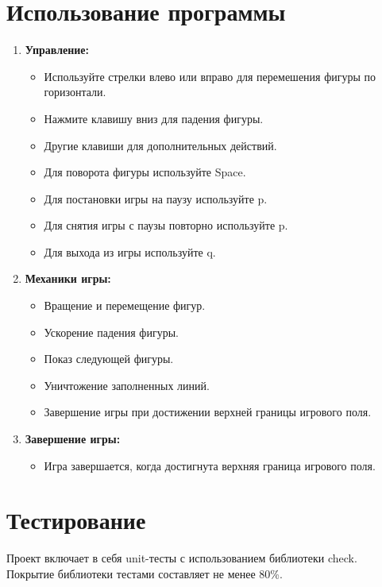 \documentclass[11pt,a4paper]{article}
\begin{document}
\section{Использование программы}

\begin{enumerate}
    \item \textbf{Управление:}
        \begin{itemize}
            \item Используйте стрелки влево или вправо для перемешения фигуры по горизонтали.
            \item Нажмите клавишу вниз для падения фигуры.
            \item Другие клавиши для дополнительных действий.
            \item Для поворота фигуры используйте Space.
            \item Для постановки игры на паузу используйте p.
            \item Для снятия игры с паузы повторно используйте p.
            \item Для выхода из игры используйте q.
        \end{itemize}
    \item \textbf{Механики игры:}
        \begin{itemize}
            \item Вращение и перемещение фигур.
            \item Ускорение падения фигуры.
            \item Показ следующей фигуры.
            \item Уничтожение заполненных линий.
            \item Завершение игры при достижении верхней границы игрового поля.
        \end{itemize}
    \item \textbf{Завершение игры:}
        \begin{itemize}
            \item Игра завершается, когда достигнута верхняя граница игрового поля.
        \end{itemize}
\end{enumerate}

\section{Тестирование}

Проект включает в себя unit-тесты с использованием библиотеки check. Покрытие библиотеки тестами составляет не менее 80\%.
\end{document}
